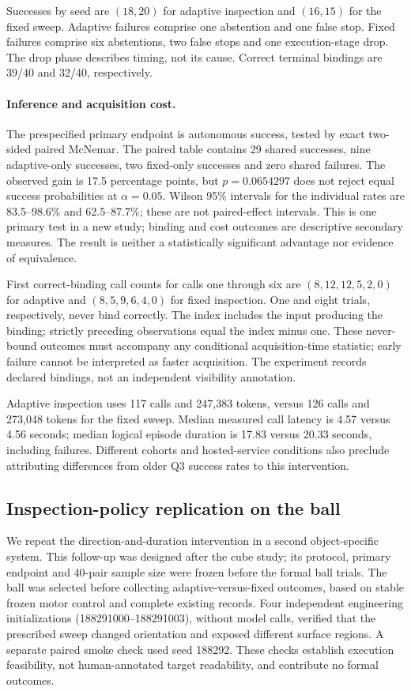 Successes by seed are $(18,20)$ for adaptive inspection and $(16,15)$ for the fixed sweep. Adaptive failures comprise one abstention and one false stop. Fixed failures comprise six abstentions, two false stops and one execution-stage drop. The drop phase describes timing, not its cause. Correct terminal bindings are 39/40 and 32/40, respectively.

\paragraph{Inference and acquisition cost.}
The prespecified primary endpoint is autonomous success, tested by exact two-sided paired McNemar. The paired table contains 29 shared successes, nine adaptive-only successes, two fixed-only successes and zero shared failures. The observed gain is 17.5 percentage points, but $p=0.0654297$ does not reject equal success probabilities at $\alpha=0.05$. Wilson 95\% intervals for the individual rates are 83.5--98.6\% and 62.5--87.7\%; these are not paired-effect intervals. This is one primary test in a new study; binding and cost outcomes are descriptive secondary measures. The result is neither a statistically significant advantage nor evidence of equivalence.

First correct-binding call counts for calls one through six are $(8,12,12,5,2,0)$ for adaptive and $(8,5,9,6,4,0)$ for fixed inspection. One and eight trials, respectively, never bind correctly. The index includes the input producing the binding; strictly preceding observations equal the index minus one. These never-bound outcomes must accompany any conditional acquisition-time statistic; early failure cannot be interpreted as faster acquisition. The experiment records declared bindings, not an independent visibility annotation.

Adaptive inspection uses 117 calls and 247,383 tokens, versus 126 calls and 273,048 tokens for the fixed sweep. Median measured call latency is 4.57 versus 4.56 seconds; median logical episode duration is 17.83 versus 20.33 seconds, including failures. Different cohorts and hosted-service conditions also preclude attributing differences from older Q3 success rates to this intervention.

\subsection{Inspection-policy replication on the ball}
\label{sec:inspection-policy-ball}
We repeat the direction-and-duration intervention in a second object-specific system. This follow-up was designed after the cube study; its protocol, primary endpoint and 40-pair sample size were frozen before the formal ball trials. The ball was selected before collecting adaptive-versus-fixed outcomes, based on stable frozen motor control and complete existing records. Four independent engineering initializations (188291000--188291003), without model calls, verified that the prescribed sweep changed orientation and exposed different surface regions. A separate paired smoke check used seed 188292. These checks establish execution feasibility, not human-annotated target readability, and contribute no formal outcomes.

